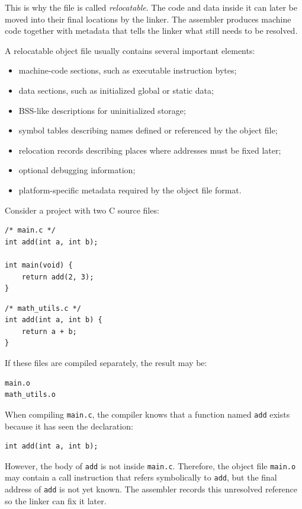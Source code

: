This is why the file is called \emph{relocatable}. The code and data inside it can later be moved into their final locations by the linker. The assembler produces machine code together with metadata that tells the linker what still needs to be resolved.

A relocatable object file usually contains several important elements:

\begin{itemize}
    \item machine-code sections, such as executable instruction bytes;
    \item data sections, such as initialized global or static data;
    \item BSS-like descriptions for uninitialized storage;
    \item symbol tables describing names defined or referenced by the object file;
    \item relocation records describing places where addresses must be fixed later;
    \item optional debugging information;
    \item platform-specific metadata required by the object file format.
\end{itemize}

Consider a project with two C source files:

\begin{verbatim}
/* main.c */
int add(int a, int b);

int main(void) {
    return add(2, 3);
}
\end{verbatim}

\begin{verbatim}
/* math_utils.c */
int add(int a, int b) {
    return a + b;
}
\end{verbatim}

If these files are compiled separately, the result may be:

\begin{verbatim}
main.o
math_utils.o
\end{verbatim}

When compiling \texttt{main.c}, the compiler knows that a function named \texttt{add} exists because it has seen the declaration:

\begin{verbatim}
int add(int a, int b);
\end{verbatim}

However, the body of \texttt{add} is not inside \texttt{main.c}. Therefore, the object file \texttt{main.o} may contain a call instruction that refers symbolically to \texttt{add}, but the final address of \texttt{add} is not yet known. The assembler records this unresolved reference so the linker can fix it later.

